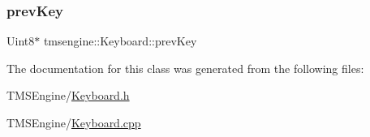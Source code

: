 \subsubsection{\texorpdfstring{prev\+Key}{prevKey}}
{\footnotesize\ttfamily Uint8$\ast$ tmsengine\+::\+Keyboard\+::prev\+Key\hspace{0.3cm}{\ttfamily [private]}}



The documentation for this class was generated from the following files\+:\begin{DoxyCompactItemize}
\item 
T\+M\+S\+Engine/\hyperlink{_keyboard_8h}{Keyboard.\+h}\item 
T\+M\+S\+Engine/\hyperlink{_keyboard_8cpp}{Keyboard.\+cpp}\end{DoxyCompactItemize}
